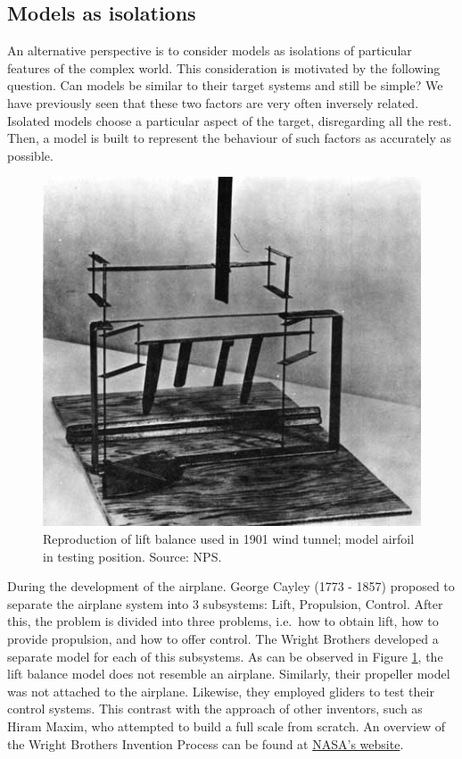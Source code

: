 \documentclass[
]{book}
\begin{document}
\hypertarget{models-as-isolations}{%
\subsection{Models as isolations}\label{models-as-isolations}}

An alternative perspective is to consider models as isolations of particular features of the complex world. This consideration is motivated by the following question. Can models be similar to their target systems and still be simple? We have previously seen that these two factors are very often inversely related. Isolated models choose a particular aspect of the target, disregarding all the rest. Then, a model is built to represent the behaviour of such factors as accurately as possible.

\begin{figure}

{\centering \includegraphics[width=0.5\linewidth]{Figures/lift} 

}

\caption{Reproduction of lift balance used in 1901 wind tunnel; model airfoil in testing position. Source: NPS.}\label{fig:lift}
\end{figure}

During the development of the airplane. George Cayley (1773 - 1857) proposed to separate the airplane system into 3 subsystems: Lift, Propulsion, Control. After this, the problem is divided into three problems, i.e.~how to obtain lift, how to provide propulsion, and how to offer control. The Wright Brothers developed a separate model for each of this subsystems. As can be observed in Figure \ref{fig:lift}, the lift balance model does not resemble an airplane. Similarly, their propeller model was not attached to the airplane. Likewise, they employed gliders to test their control systems. This contrast with the approach of other inventors, such as Hiram Maxim, who attempted to build a full scale from scratch.
An overview of the Wright Brothers Invention Process can be found at \href{https://wright.nasa.gov/overview.htm}{NASA's website}.
\end{document}
